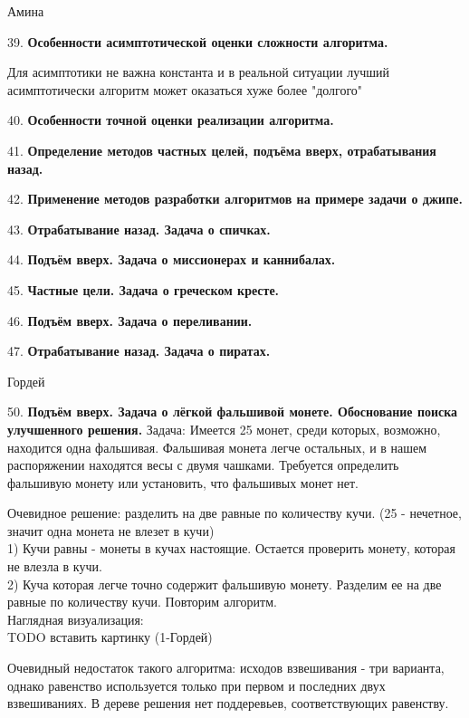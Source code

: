 \documentclass[12pt]{article}
\begin{document}
\begin{center}
    Амина
\end{center}

39. \textbf{Особенности асимптотической оценки сложности алгоритма.}

Для асимптотики не важна константа и в реальной ситуации лучший асимптотически алгоритм может оказаться хуже более "долгого"

40. \textbf{Особенности точной оценки реализации алгоритма.}

41. \textbf{Определение методов частных целей, подъёма вверх, отрабатывания назад.}

42. \textbf{Применение методов разработки алгоритмов на примере задачи о джипе.}

43. \textbf{Отрабатывание назад. Задача о спичках.}

44. \textbf{Подъём вверх. Задача о миссионерах и каннибалах.}

45. \textbf{Частные цели. Задача о греческом кресте.}

46. \textbf{Подъём вверх. Задача о переливании.}

47. \textbf{Отрабатывание назад. Задача о пиратах.}


\begin{center}
    Гордей
\end{center}


50. \textbf{Подъём вверх. Задача о лёгкой фальшивой монете. Обоснование поиска улучшенного решения.}
Задача: Имеется 25 монет, среди которых, возможно, находится одна фальшивая. 
Фальшивая монета легче остальных, и в нашем распоряжении находятся весы с двумя чашками. 
Требуется определить фальшивую монету или установить, что фальшивых монет нет.

Очевидное решение: разделить на две равные по количеству кучи. (25 - нечетное, значит одна монета не влезет в кучи) \\
1) Кучи равны - монеты в кучах настоящие. Остается проверить монету, которая не влезла в кучи. \\
2) Куча которая легче точно содержит фальшивую монету. Разделим ее на две равные по количеству кучи. Повторим алгоритм. \\

Наглядная визуализация: 
\\TODO вставить картинку (1-Гордей)

Очевидный недостаток такого алгоритма: исходов взвешивания - три варианта, однако равенство используется только при первом и последних двух взвешиваниях. 
В дереве решения нет поддеревьев, соответствующих равенству.
\end{document}
